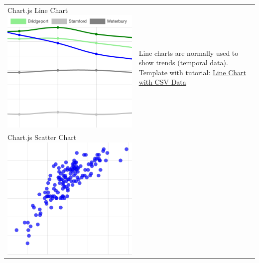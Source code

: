 \documentclass[
  english,
]{book}
\begin{document}
\begin{longtable}[]{@{}ll@{}}
\begin{minipage}[t]{0.47\columnwidth}
Chart.js Line Chart \includegraphics{images/12-chartjs/chartjs-line.png}\strut
\end{minipage} & \begin{minipage}[t]{0.47\columnwidth}\raggedright
Line charts are normally used to show trends (temporal data). Template with tutorial: \href{line-chart-with-csv-data}{Line Chart with CSV Data}\strut
\end{minipage}\tabularnewline
\begin{minipage}[t]{0.47\columnwidth}\raggedright
Chart.js Scatter Chart \includegraphics{images/12-chartjs/chartjs-scatter.png}\strut

\end{minipage}
\end{longtable}
\end{document}

